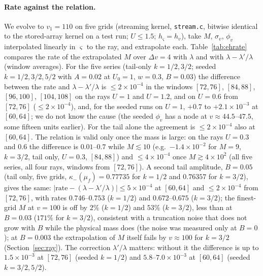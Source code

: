 \documentclass[11pt]{article}
\begin{document}
\paragraph{Rate against the relation.} We evolve to $v_1=110$ on five grids (streaming kernel, \texttt{stream.c}, bitwise identical to the stored-array kernel on a test run; $U\le1.5$; $h_\varsigma=h_v$), take $M$, $\sigma_v$, $\phi_v$ interpolated linearly in $\varsigma$ to the ray, and extrapolate each. Table~\ref{tab:ehrate} compares the rate of the extrapolated $M$ over $\Delta v=4$ with $\lambda$ and with $\lambda-\lambda'/\lambda$ (window averages). For the five series (tail-only $k=1/2,3/2$; seeded $k=1/2,3/2,5/2$ with $A=0.02$ at $U_0=1$, $w=0.3$, $B=0.03$) the difference between the rate and $\lambda-\lambda'/\lambda$ is $\le2\times10^{-4}$ in the windows $[72,76]$, $[84,88]$, $[96,100]$, $[104,108]$ on the rays $U=1$ and $U=1.2$, and on $U=0.6$ from $[72,76]$ ($\le2\times10^{-4}$), and, for the seeded runs on $U=1$, $+0.7$ to $+2.1\times10^{-3}$ at $[60,64]$; we do not know the cause (the seeded $\phi_v$ has a node at $v\approx44.5$--$47.5$, some fifteen units earlier). For the tail alone the agreement is $\le2\times10^{-4}$ also at $[60,64]$. The relation is valid only once the mass is large: on the rays $U=0.3$ and $0.6$ the difference is $0.01$--$0.7$ while $M\lesssim10$ (e.g.\ $-1.4\times10^{-2}$ for $M=9$, $k=3/2$, tail only, $U=0.3$, $[84,88]$) and $\le4\times10^{-4}$ once $M\gtrsim4\times10^{2}$ (all five series, all four rays, windows from $[72,76]$). A second tail amplitude, $B=0.05$ (tail only, five grids, $\kappa_-(\mu_f)=0.77735$ for $k=1/2$ and $0.76357$ for $k=3/2$), gives the same: $|\text{rate}-(\lambda-\lambda'/\lambda)|\le5\times10^{-4}$ at $[60,64]$ and $\le2\times10^{-4}$ from $[72,76]$, with rates $0.746$--$0.753$ ($k=1/2$) and $0.672$--$0.675$ ($k=3/2$); the finest-grid $M$ at $v=100$ is off by $2\%$ ($k=1/2$) and $53\%$ ($k=3/2$), less than at $B=0.03$ ($171\%$ for $k=3/2$), consistent with a truncation noise that does not grow with $B$ while the physical mass does (the noise was measured only at $B=0$); at $B=0.003$ the extrapolation of $M$ itself fails by $v\approx100$ for $k=3/2$ (Section~\ref{sec:ray}). The correction $\lambda'/\lambda$ matters: without it the difference is up to $1.5\times10^{-3}$ at $[72,76]$ (seeded $k=1/2$) and $5.8$--$7.0\times10^{-3}$ at $[60,64]$ (seeded $k=3/2,5/2$).
\end{document}
